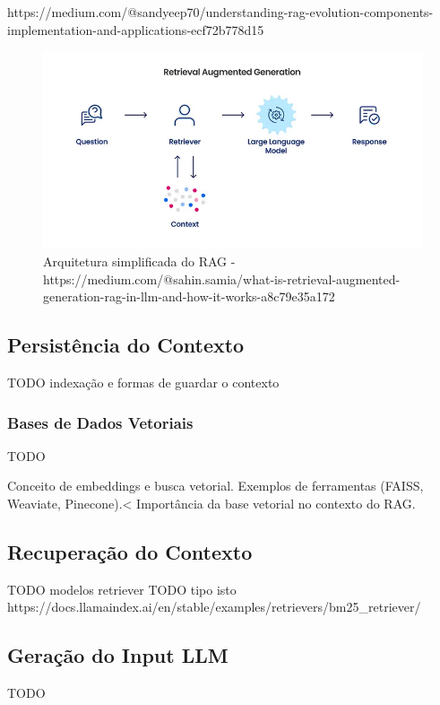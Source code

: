 https://medium.com/@sandyeep70/understanding-rag-evolution-components-implementation-and-applications-ecf72b778d15



\begin{figure}[H]
        \centering
        \includegraphics[width=0.7\linewidth]{ch2/assets/RAG-ach.png
        }
        \caption{Arquitetura simplificada do RAG - https://medium.com/@sahin.samia/what-is-retrieval-augmented-generation-rag-in-llm-and-how-it-works-a8c79e35a172}
        \label{fig:acrh-rag}
\end{figure}


\subsection{Persistência do Contexto}

TODO indexação e formas de guardar o contexto

\subsubsection{Bases de Dados Vetoriais}

TODO

Conceito de embeddings e busca vetorial.
Exemplos de ferramentas (FAISS, Weaviate, Pinecone).<
Importância da base vetorial no contexto do RAG.


\subsection{Recuperação do Contexto}
\label{recu-context}

TODO modelos retriever
TODO tipo isto https://docs.llamaindex.ai/en/stable/examples/retrievers/bm25_retriever/


\subsection{Geração do Input LLM}

TODO

